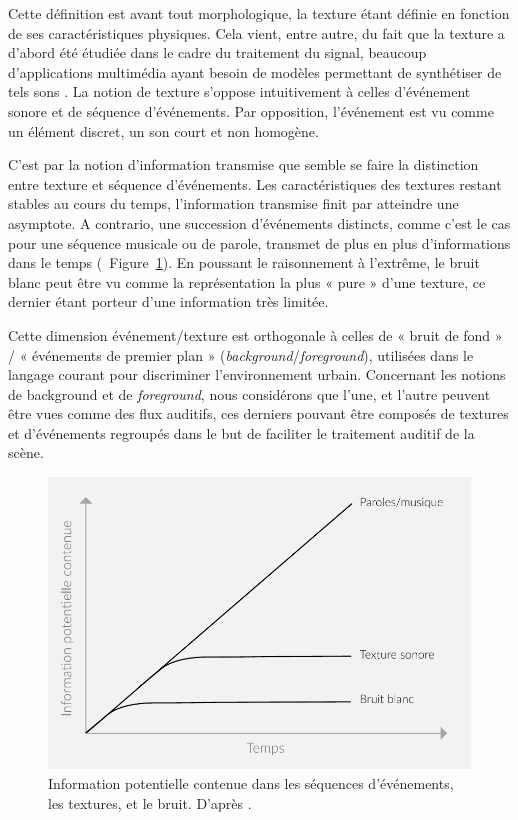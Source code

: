 Cette définition est avant tout morphologique, la texture étant définie en fonction de ses caractéristiques physiques. Cela vient, entre autre, du fait que la texture a d'abord été étudiée dans le cadre du traitement du signal, beaucoup d'applications multimédia ayant besoin de  modèles permettant de synthétiser de tels sons \citep{schwarz2011state}. La notion de texture s'oppose intuitivement à celles d'événement sonore et de séquence d'événements. Par opposition, l'événement est vu comme un élément discret, un son court et non homogène.

C'est par la notion d'information transmise que semble se faire la distinction entre texture et séquence d'événements. Les caractéristiques des textures restant stables au cours du temps, l'information transmise finit par atteindre une asymptote. A contrario, une succession d'événements distincts, comme c'est le cas pour une séquence musicale ou de parole, transmet de plus en plus d'informations dans le temps (\cf~Figure~\ref{fig:texture}). En poussant le raisonnement à l’extrême, le bruit blanc peut être vu comme la représentation la plus « pure » d'une texture, ce dernier étant porteur d'une information très limitée.

Cette dimension événement/texture est orthogonale à celles de « bruit de fond » / « événements de premier plan » (\emph{background}/\emph{foreground}), utilisées dans le langage courant pour discriminer l’environnement urbain. Concernant les notions de background et de \emph{foreground}, nous considérons que l'une, et l'autre peuvent être vues comme des flux auditifs, ces derniers pouvant être composés de textures et d’événements regroupés dans le but de faciliter le traitement auditif de la scène.

\begin{figure}[t]
        \myfloatalign
        \includegraphics[width=.8\linewidth]{gfx/ch_3/texture}
        \caption[Information potentielle contenue dans les séquences d'événements, les textures, et le bruit.]{Information potentielle contenue dans les séquences d'événements, les textures, et le bruit. D'après \citep{saint1995classification}.}\label{fig:texture}
\end{figure}

